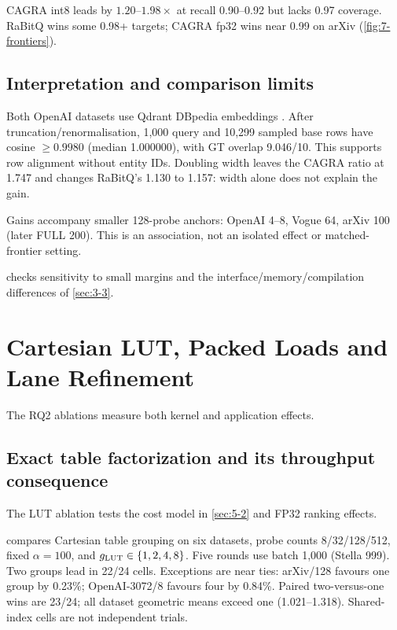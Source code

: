 CAGRA int8 leads by $1.20$--$1.98\times$ at recall 0.90--0.92 but lacks 0.97 coverage. RaBitQ wins some 0.98+ targets; CAGRA fp32 wins near 0.99 on arXiv (\cref{fig:7-frontiers}).



\subsection{Interpretation and comparison limits}

Both OpenAI datasets use Qdrant DBpedia embeddings \cite{data_openai1536,data_openai3072}. After truncation/renormalisation, 1,000 query and 10,299 sampled base rows have cosine $\geq0.9980$ (median 1.000000), with GT overlap 9.046/10. This supports row alignment without entity IDs. Doubling width leaves the CAGRA ratio at 1.747 and changes RaBitQ's 1.130 to 1.157: width alone does not explain the gain.

Gains accompany smaller 128-probe anchors: OpenAI 4--8, Vogue 64, arXiv 100 (later FULL 200). This is an association, not an isolated effect or matched-frontier setting.

 checks sensitivity to small margins and the interface/memory/compilation differences of \cref{sec:3-3}.




\section{Cartesian LUT, Packed Loads and Lane Refinement}
\label{sec:7-3}

The RQ2 ablations measure both kernel and application effects.

\subsection{Exact table factorization and its throughput consequence}

The LUT ablation tests the cost model in \cref{sec:5-2} and FP32 ranking
effects.

 compares Cartesian table grouping on six datasets,
probe counts 8/32/128/512,
fixed $\alpha=100$, and $g_{\mathrm{LUT}}\in\{1,2,4,8\}$. Five rounds use batch 1,000 (Stella 999). Two groups lead in 22/24 cells. Exceptions are near ties: arXiv/128 favours one group by 0.23\%; OpenAI-3072/8 favours four by 0.84\%. Paired two-versus-one wins are 23/24; all dataset geometric means exceed one (1.021--1.318). Shared-index cells are not independent trials.

